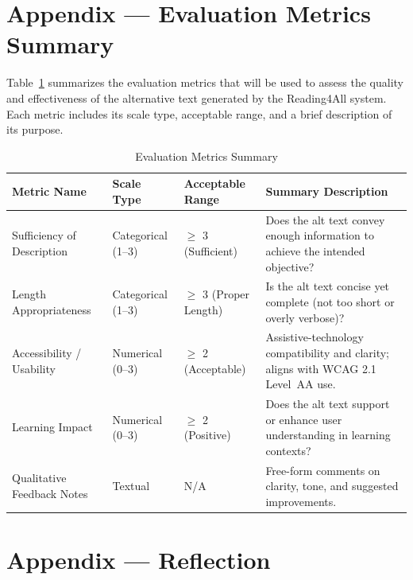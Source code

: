 \documentclass[12pt]{article}
\begin{document}
\section*{Appendix --- Evaluation Metrics Summary}
\label{sec:evaluation-metrics}
Table~\ref{tab:evaluation-metrics-summary} summarizes the evaluation metrics that will be used to assess the quality and effectiveness of the alternative text generated by the Reading4All system. Each metric includes its scale type, acceptable range, and a brief description of its purpose.
\begin{table}[H]
    \centering
    \caption{Evaluation Metrics Summary}
    \label{tab:evaluation-metrics-summary}
    \begin{tabular}{p{3.5cm}|p{3cm}|p{3cm}|p{4cm}}
      \midrule
      \textbf{Metric Name} & \textbf{Scale Type} & \textbf{Acceptable Range} & \textbf{Summary Description} \\
      \midrule
      Sufficiency of Description
        & Categorical (1--3)
        & $\geq$ 3 (Sufficient)
        & Does the alt text convey enough information to achieve the intended objective? \\
      \midrule
      Length Appropriateness
        & Categorical (1--3)
        & $\geq$ 3 (Proper Length)
        & Is the alt text concise yet complete (not too short or overly verbose)? \\
      \midrule
      Accessibility / Usability
        & Numerical (0--3)
        & $\geq$ 2 (Acceptable)
        & Assistive-technology compatibility and clarity; aligns with WCAG 2.1 Level~AA use. \\
      \midrule
      Learning Impact
        & Numerical (0--3)
        & $\geq$ 2 (Positive)
        & Does the alt text support or enhance user understanding in learning contexts? \\
      \midrule
      Qualitative Feedback Notes
        & Textual
        & N/A
        & Free-form comments on clarity, tone, and suggested improvements. \\
      \midrule
    \end{tabular}
  \end{table}
  

\section*{Appendix --- Reflection}




\end{document}
